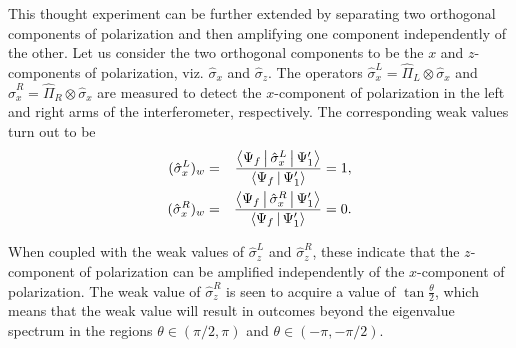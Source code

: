 \documentclass[aps,pra,showpacs,twoside,twocolumn,10pt]{revtex4-1}
\begin{document}
 This thought experiment can be further extended by separating two orthogonal components of polarization and then amplifying one component independently of the other. Let us consider the two orthogonal components to be the $x$ and $z$-components of polarization, 
 viz. \(\hat{\sigma}_x\) and \(\hat{\sigma}_z\).
The operators $\hat{\sigma}_x^{L}=\hat{\Pi}_L\otimes \hat{\sigma}_x$ and $\hat{\sigma}_x^{R}=\hat{\Pi}_R\otimes \hat{\sigma}_x$ are measured to detect the $x$-component of polarization in the left and right arms of the interferometer, respectively. The corresponding weak values turn out to be
\begin{eqnarray}
(\hat{\sigma}_x^{L})_w&=&\frac{\Braket{\Psi_f|\hat{\sigma}_x^{L}|\Psi_1^{\prime}}}{\Braket{\Psi_f|\Psi_1^{\prime}}}=1, \nonumber\\
(\hat{\sigma}_x^{R})_w&=&\frac{\Braket{\Psi_f|\hat{\sigma}_x^{R}|\Psi_1^{\prime}}}{\Braket{\Psi_f|\Psi_1^{\prime}}}=0.
    \end{eqnarray}
    \par
    When coupled with the weak values of $\hat{\sigma}_z^{L}$ and $\hat{\sigma}_z^{R}$, these indicate that the $z$-component of polarization can be amplified independently of the $x$-component of polarization. 
    The weak value of $\hat{\sigma}_z^{R}$ is seen to acquire a value of $\tan\frac{\theta}{2}$, which means that the weak value will result in outcomes beyond the eigenvalue spectrum in the regions $\theta \in (\pi/2,\pi)$
and $\theta \in (-\pi,-\pi/2)$. %
    
\end{document}
